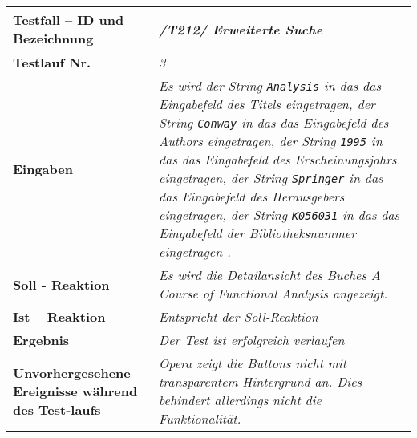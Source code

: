\begin{longtable}{|p{5cm}|p{10cm}|}
\hline
\textbf{Testfall -- ID und Bezeichnung} & \textit{/T212/ Erweiterte
Suche} \\
\hline
\textbf{Testlauf Nr.} & \textit{3} \\
\hline
\textbf{Eingaben} & \textit{Es wird 
der String \lstinline{Analysis} in das das Eingabefeld des Titels eingetragen,
der String \lstinline{Conway} in das das Eingabefeld des Authors eingetragen,
der String \lstinline{1995} in das das Eingabefeld des Erscheinungsjahrs
eingetragen,
der String \lstinline{Springer} in das das Eingabefeld des Herausgebers
eingetragen,
der String \lstinline{K056031} in das das Eingabefeld der Bibliotheksnummer eingetragen
.} \\
\hline
\textbf{Soll - Reaktion} & \textit{Es wird die Detailansicht des Buches \emph{A
Course of Functional Analysis} angezeigt.} \\
\hline
\textbf{Ist -- Reaktion} & \textit{Entspricht der Soll-Reaktion} \\
\hline
\textbf{Ergebnis} & \textit{Der Test ist erfolgreich verlaufen} \\
\hline
\textbf{Unvorhergesehene Ereignisse w\"ahrend des Test-laufs } &
\textit{Opera zeigt die Buttons nicht mit transparentem Hintergrund an. Dies
behindert allerdings nicht die Funktionalität.} \\
\hline
\end{longtable}

